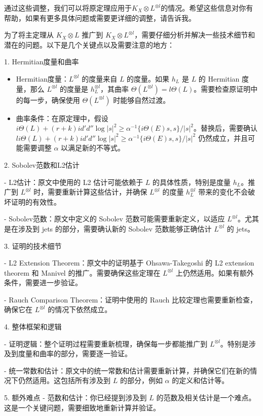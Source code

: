 \documentclass[lang=cn,12pt,a4paper,fontset=none]{beautybook}
\begin{document}
通过这些调整，我们可以将原定理应用于$K_X\otimes L^{\otimes l}$的情况。希望这些信息对你有帮助，如果有更多具体问题或需要更详细的调整，请告诉我。


为了将主定理从 $K_X \otimes L$ 推广到 $K_X \otimes L^{\otimes l}$，需要仔细分析并解决一些技术细节和潜在的问题。以下是几个关键点以及需要注意的地方：

1. Hermitian度量和曲率
\begin{itemize}
  \item Hermitian度量：$L^{\otimes l}$ 的度量来自 $L$ 的度量。如果 $h_L$ 是 $L$ 的 Hermitian 度量，那么 $L^{\otimes l}$ 的度量是 $h_L^{\otimes l}$，其曲率 $\Theta(L^{\otimes l}) = l\Theta(L)$。需要检查原证明中的每一步，确保使用 $\Theta(L^{\otimes l})$ 时能够自然过渡。
  \item 曲率条件：在原定理中，假设 $i\Theta(L) + (r + k) id'd'' \log |s|^2 \geq α^{-1} \{i\Theta(E)s, s\}/|s|^2$。替换后，需要确认 $li\Theta(L) + (r + k) id'd'' \log |s|^2 \geq α^{-1} \{i\Theta(E)s, s\}/|s|^2$ 仍然成立，并且可能需要调整 $α$ 以满足新的不等式。
\end{itemize}

2. Sobolev范数和L2估计

   - L2估计：原文中使用的 L2 估计可能依赖于 $L$ 的具体性质，特别是度量 $h_L$。推广到 $L^{\otimes l}$ 时，需要重新计算这些估计，并确保 $L^{\otimes l}$ 的度量 $h_L^{\otimes l}$ 带来的变化不会破坏证明的有效性。
   
   - Sobolev范数：原文中定义的 Sobolev 范数可能需要重新定义，以适应 $L^{\otimes l}$。尤其是在涉及到 jets 的部分，需要确认新的 Sobolev 范数能够正确估计 $L^{\otimes l}$ 的 jets。

3. 证明的技术细节

   - L2 Extension Theorem：原文中的证明基于 Ohsawa-Takegoshi 的 L2 extension theorem 和 Manivel 的推广。需要确保这些定理在 $L^{\otimes l}$ 上仍然适用。如果有额外条件，需要进一步验证。
   
   - Rauch Comparison Theorem：证明中使用的 Rauch 比较定理也需要重新检查，确保它在 $L^{\otimes l}$ 的情况下依然成立。

4. 整体框架和逻辑

   - 证明逻辑：整个证明过程需要重新梳理，确保每一步都能推广到 $L^{\otimes l}$。特别是涉及到度量和曲率的部分，需要逐一验证。
   
   - 统一常数和估计：原文中的统一常数和估计需要重新计算，并确保它们在新的情况下仍然适用。这包括所有涉及到 $L$ 的部分，例如 $α$ 的定义和估计等。

5. 额外难点
   - 范数和估计：你已经提到涉及到 $L$ 的范数及相关估计是一个难点。这是一个关键问题，需要细致地重新计算并验证。
   
\end{document}
